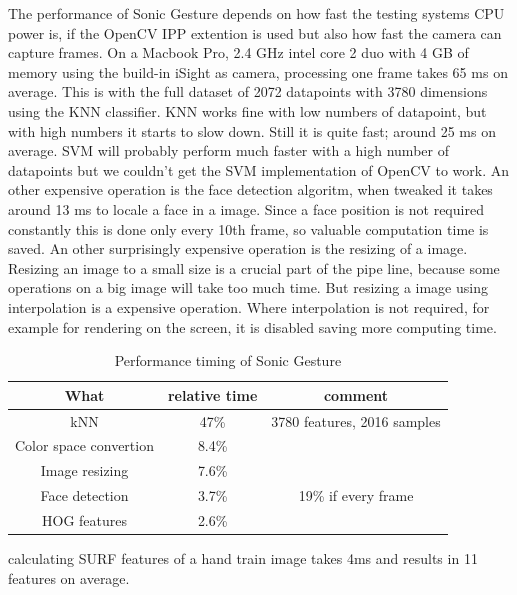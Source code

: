 The performance of Sonic Gesture depends on how fast the testing systems CPU power is, if the OpenCV IPP extention is used but also how fast the camera can capture frames. On a Macbook Pro, 2.4 GHz intel core 2 duo with 4 GB of memory using the build-in iSight as camera, processing one frame takes 65 ms on average. This is with the full dataset of 2072 datapoints with 3780 dimensions using the KNN classifier. KNN works fine with low numbers of datapoint, but with high numbers it starts to slow down. Still it is quite fast; around 25 ms on average. SVM will probably perform much faster with a high number of datapoints but we couldn't get the SVM implementation of OpenCV to work. An other expensive operation is the face detection algoritm, when tweaked it takes around 13 ms to locale a face in a image. Since a face position is not required constantly this is done only every 10th frame, so valuable computation time is saved. An other surprisingly expensive operation is the resizing of a image. Resizing an image to a small size is a crucial part of the pipe line, because some operations on a big image will take too much time. But resizing a image using interpolation is a expensive operation. Where interpolation is not required, for example for rendering on the screen, it is disabled saving more computing time. 



\begin{table}
\centering
\begin{tabular}{ccc}
What & relative time & comment \\
\hline
kNN & 47\% & 3780 features, 2016 samples \\
Color space convertion & 8.4\% & \\
Image resizing & 7.6\% & \\
Face detection & 3.7\% &  19\% if every frame \\
HOG features & 2.6\% \\
\end{tabular}
\caption{Performance timing of Sonic Gesture}
\end{table}

calculating SURF features of a hand train image takes 4ms and results in 11 features on average.
